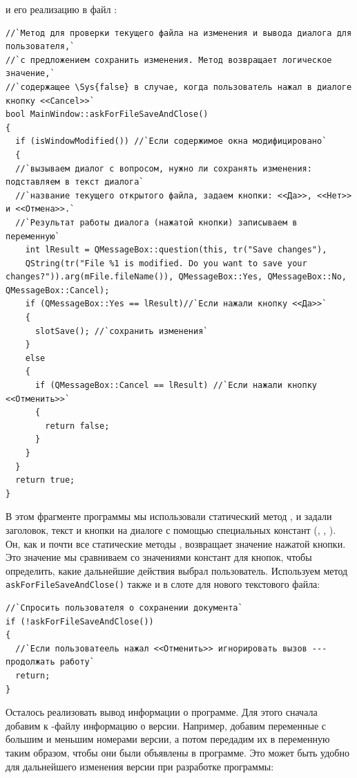 и его реализацию в файл  :
\begin{lstlisting}
//`Метод для проверки текущего файла на изменения и вывода диалога для пользователя,`
//`с предложением сохранить изменения. Метод возвращает логическое значение,` 
//`содержащее \Sys{false} в случае, когда пользователь нажал в диалоге кнопку <<Cancel>>` 
bool MainWindow::askForFileSaveAndClose()
{
  if (isWindowModified()) //`Если содержимое окна модифицировано`
  {
  //`вызываем диалог с вопросом, нужно ли сохранять изменения: подставляем в текст диалога`
  //`название текущего открытого файла, задаем кнопки: <<Да>>, <<Нет>> и <<Отмена>>.`
  //`Результат работы диалога (нажатой кнопки) записываем в переменную`
    int lResult = QMessageBox::question(this, tr("Save changes"),
    QString(tr("File %1 is modified. Do you want to save your changes?")).arg(mFile.fileName()), QMessageBox::Yes, QMessageBox::No, QMessageBox::Cancel);
    if (QMessageBox::Yes == lResult)//`Если нажали кнопку <<Да>>`
    {
      slotSave(); //`сохранить изменения` 
    }
    else
    {
      if (QMessageBox::Cancel == lResult) //`Если нажали кнопку <<Отменить>>`
      {
        return false;
      }
    }
  }
  return true;
}
\end{lstlisting}

В этом фрагменте программы мы использовали статический 
метод , и задали
заголовок, текст и кнопки на диалоге с помощью специальных констант (,
 , ). Он, как и почти все статические 
методы , возвращает значение нажатой кнопки. Это
значение мы сравниваем со значениями констант для кнопок, чтобы определить, 
какие дальнейшие действия выбрал
пользователь. Используем метод \lstinline!askForFileSaveAndClose()! 
также и в слоте для нового текстового файла: 
\begin{lstlisting}
//`Спросить пользователя о сохранении документа`
if (!askForFileSaveAndClose())
{
  //`Если пользоватеель нажал <<Отменить>> игнорировать вызов --- продолжать работу` 
  return;
}
\end{lstlisting}

Осталось реализовать вывод информации о программе. Для этого сначала добавим к
-файлу информацию о версии. Например, добавим переменные с большим и меньшим
номерами версии, а потом передадим их в переменную  
таким образом, чтобы они
были объявлены в программе. Это может быть удобно для дальнейшего изменения версии 
при разработке программы: 

